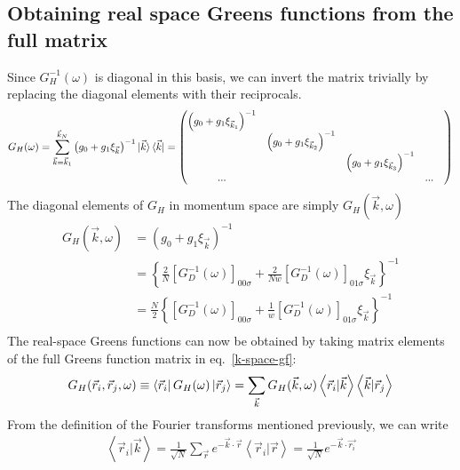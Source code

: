 \documentclass[12pt]{article}
\numberwithin{equation}{section}
\begin{document}
\subsection{Obtaining real space Greens functions from the full matrix}
Since $G_H^{-1}(\omega)$ is diagonal in this basis, we can invert the matrix trivially by replacing the diagonal elements with their reciprocals.
\begin{equation}\begin{aligned}
	\label{k-space-gf}
	G_H(\omega) = \sum_{\vec k=\vec k_1}^{\vec k_N}\left(g_0 + g_1 \xi_{\vec k}\right)^{-1}\ket{\vec k}\bra{\vec k} = \begin{pmatrix} \left(g_0 + g_1\xi_{\vec k_1}\right)^{-1} &&&&\\
	& \left(g_0 + g_1\xi_{\vec k_2}\right)^{-1} &&&\\
	&& \left(g_0 + g_1\xi_{\vec k_3}\right)^{-1} &&\\
		...&&&...&\\
	\end{pmatrix} 
\end{aligned}\end{equation}
The diagonal elements of $G_H$ in momentum space are simply $G_H(\vec k, \omega)$
\begin{equation}\begin{aligned}
	G_H(\vec k, \omega) &= \left(g_0 + g_1 \xi_{\vec k}\right)^{-1}\\
			    &= \left\{\frac{2}{N}\left[G_{D}^{-1}(\omega)\right]_{00\sigma} + \frac{2}{Nw}\left[G_{D}^{-1}(\omega)\right]_{01\sigma}\xi_{\vec k}\right\}^{-1}\\
			    &= \frac{N}{2}\left\{\left[G_{D}^{-1}(\omega)\right]_{00\sigma} + \frac{1}{w}\left[G_{D}^{-1}(\omega)\right]_{01\sigma}\xi_{\vec k}\right\}^{-1}\\
\end{aligned}\end{equation}
The real-space Greens functions can now be obtained by taking matrix elements of the full Greens function matrix in eq.~\ref{k-space-gf}:
\begin{equation}\begin{aligned}
	G_H(\vec r_i, \vec  r_j, \omega) \equiv \bra{\vec r_i} G_H(\omega) \ket{\vec r_j} = \sum_{\vec k} G_H(\vec k, \omega)  \left<\vec r_i | \vec k\right>\left<\vec k | \vec r_j\right>
\end{aligned}\end{equation}
From the definition of the Fourier transforms mentioned previously, we can write
\begin{equation}\begin{aligned}
	\left<\vec r_i | \vec k\right> = \frac{1}{\sqrt N}\sum_{\vec r} e^{- \vec{k}\cdot\vec{r}} \left<\vec r_i | \vec r \right> = \frac{1}{\sqrt N}e^{- \vec{k}\cdot\vec{r_i}}
\end{aligned}\end{equation}
\end{document}
